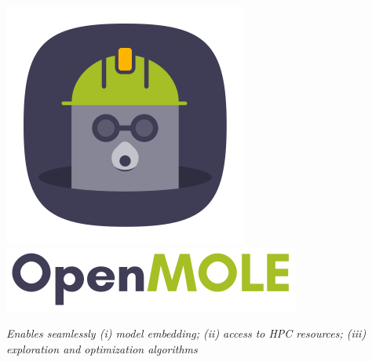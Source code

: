 {\begin{center}
\includegraphics[height=0.13\textheight]{figures/iconOM.png}
\includegraphics[height=0.13\textheight]{figures/openmole.png}
\end{center}


\footnotesize
\textit{Enables seamlessly (i) model embedding; (ii) access to HPC resources; (iii) exploration and optimization algorithms}


}


